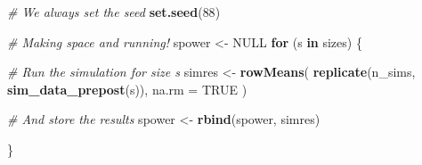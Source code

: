 \documentclass[
]{book}
\newenvironment{Shaded}{\begin{snugshade}}{\end{snugshade}}
\newcommand{\AttributeTok}[1]{\textcolor[rgb]{0.13,0.29,0.53}{#1}}
\newcommand{\CommentTok}[1]{\textcolor[rgb]{0.56,0.35,0.01}{\textit{#1}}}
\newcommand{\ConstantTok}[1]{\textcolor[rgb]{0.56,0.35,0.01}{#1}}
\newcommand{\ControlFlowTok}[1]{\textcolor[rgb]{0.13,0.29,0.53}{\textbf{#1}}}
\newcommand{\DecValTok}[1]{\textcolor[rgb]{0.00,0.00,0.81}{#1}}
\newcommand{\FunctionTok}[1]{\textcolor[rgb]{0.13,0.29,0.53}{\textbf{#1}}}
\newcommand{\NormalTok}[1]{#1}
\newcommand{\OtherTok}[1]{\textcolor[rgb]{0.56,0.35,0.01}{#1}}
\newcommand{\SpecialCharTok}[1]{\textcolor[rgb]{0.81,0.36,0.00}{\textbf{#1}}}
\newcommand{\StringTok}[1]{\textcolor[rgb]{0.31,0.60,0.02}{#1}}
\begin{document}
\begin{Shaded}
\end{Shaded}

\begin{Shaded}
\begin{Highlighting}[]
\CommentTok{\# We always set the seed }
\FunctionTok{set.seed}\NormalTok{(}\DecValTok{88}\NormalTok{)}

\CommentTok{\# Making space and running!}
\NormalTok{spower }\OtherTok{\textless{}{-}} \ConstantTok{NULL}
\ControlFlowTok{for}\NormalTok{ (s }\ControlFlowTok{in}\NormalTok{ sizes) \{}

  \CommentTok{\# Run the simulation for size s}
\NormalTok{  simres }\OtherTok{\textless{}{-}} \FunctionTok{rowMeans}\NormalTok{(}
    \FunctionTok{replicate}\NormalTok{(n\_sims, }\FunctionTok{sim\_data\_prepost}\NormalTok{(s)),}
    \AttributeTok{na.rm =} \ConstantTok{TRUE}
\NormalTok{    )}

  \CommentTok{\# And store the results}
\NormalTok{  spower }\OtherTok{\textless{}{-}} \FunctionTok{rbind}\NormalTok{(spower, simres)}

\NormalTok{\}}
\end{Highlighting}
\end{Shaded}
\end{document}
